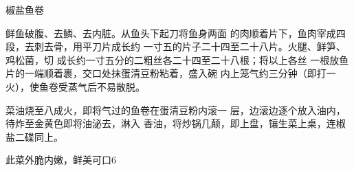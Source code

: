\begin{recipe}{椒盐鱼卷}

\ingredients


\cooking

\step 鲜鱼破腹、去鳞、去内脏。从鱼头下起刀将鱼身两面 的肉顺着片下，鱼肉宰成四段，去刺去骨，用平刀片成长约 一寸五的片子二十四至二十八片。火腿、鲜笋、鸡松菌，切 成长约一寸五分的二粗丝各二十四至二十八根；将以上各丝 一根放鱼片的一端顺着裹，交口处抹蛋清豆粉粘着，盛入碗 内上笼气约三分钟（即打一火），使鱼卷受蒸气后不易散脱。

\step 菜油烧至八成火，即将气过的鱼卷在蛋清豆粉内滚一 层，边滚边逐个放入油内，待炸至金黄色即将油泌去，淋入 香油，将炒锅几颠，即上盘，镶生菜上桌，连椒盐二碟同上。

\notes

此菜外脆内嫩，鲜美可口6

\end{recipe}

